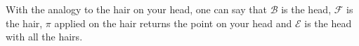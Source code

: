 With the analogy to the hair on your head, one can say that $\mathcal B$ is the head, $\mathcal F$ is the hair, $\pi$ applied on the hair returns the point on your head and $\mathcal E$ is the head with all the hairs.











